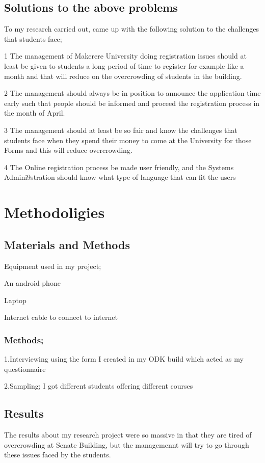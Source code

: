 \documentclass[14pt]{article}
\begin{document}
\subsection{Solutions to the above problems}
To my research carried out, came up with the following solution to the challenges that students face;\par
1	The management of Makerere University doing registration issues should at least be given to students a long period of time to register for example like a month and that will reduce on the overcrowding of students in the building.\par
2	The management should always be in position to announce the application time early such that people should be informed and proceed the registration process in the month of April.\par
3	The management should at least be so fair and know the challenges that students face when they spend their money to come at the University for those Forms and this will reduce overcrowding.\par
4	The Online registration process be made user friendly, and the Systems Admini9stration should know what type of language that can fit the users

\section{Methodoligies}

   \subsection{Materials and Methods}
Equipment used in my project;\par
An android phone\par
Laptop\par
Internet cable to connect to internet
 \subsubsection{Methods;}
1.Interviewing using the form I created in my ODK build which acted as my questionnaire\par
2.Sampling; I got different students offering different courses


\subsection{Results}
The results about my research project were so massive in that they are tired of overcrowding at Senate Building, but the managemennt will try to go through these issues faced by the students.
\end{document}
